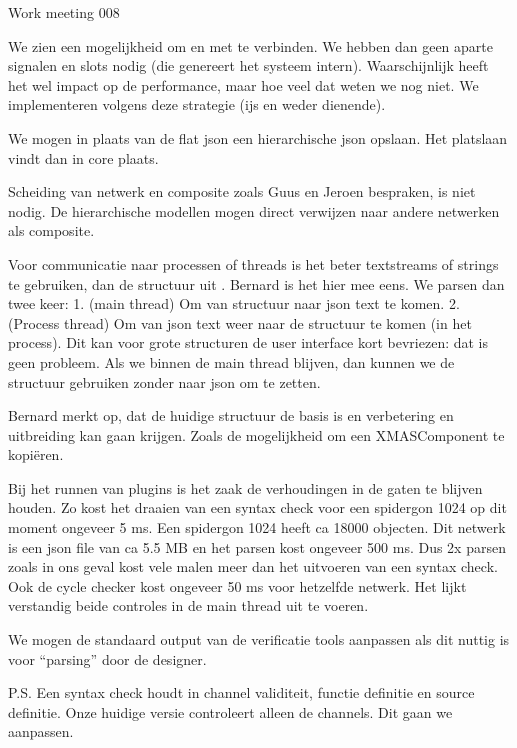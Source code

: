 \documentclass[a4paper,final]{article}
\begin{document}
\begin{Minutes}{Work meeting 008}

We zien een mogelijkheid om \qml en \cpp met \qml {} te verbinden. 
We hebben dan geen aparte signalen en slots nodig (die genereert het systeem intern).
Waarschijnlijk heeft het wel impact op de performance, maar hoe veel dat weten we nog niet.  
We implementeren volgens deze strategie (ijs en weder dienende).


We mogen in plaats van de flat json een hierarchische json opslaan. Het platslaan vindt
dan in core plaats.

Scheiding van netwerk en composite zoals Guus en Jeroen bespraken, is niet nodig. 
De hierarchische modellen mogen direct verwijzen naar andere netwerken als composite.


Voor communicatie naar processen of threads is het beter textstreams of strings te gebruiken, 
dan de \cpp structuur uit . Bernard is het hier mee eens.
We parsen dan twee keer: 1. (main thread) Om van \cpp structuur naar json text te komen. 2. (Process thread) 
Om van json text weer naar de \cpp structuur te komen (in het \vt process). Dit kan voor grote structuren de 
user interface kort bevriezen: dat is geen probleem. Als we binnen de main thread blijven, 
dan kunnen we de structuur gebruiken zonder naar json om te zetten.

Bernard merkt op, dat de huidige structuur de basis is en verbetering en uitbreiding kan gaan 
krijgen. Zoals de mogelijkheid om een XMASComponent te kopi\"{e}ren.



Bij het runnen van plugins is het zaak de verhoudingen in de gaten te blijven houden. Zo kost
het draaien van een syntax check voor een spidergon 1024 op dit moment ongeveer 5 ms. Een 
spidergon 1024 heeft ca 18000 objecten. Dit netwerk is een json file van ca 5.5 MB en het parsen kost
ongeveer 500 ms. Dus 2x parsen zoals in ons geval kost vele malen meer dan het uitvoeren 
van een syntax check. Ook de cycle checker kost ongeveer 50 ms voor hetzelfde netwerk. 
Het lijkt verstandig beide controles in de main thread uit te voeren.

We mogen de standaard output van de verificatie tools aanpassen als dit nuttig is voor 
``parsing'' door de designer.

P.S. Een syntax check houdt in channel validiteit, functie definitie en source definitie. Onze huidige
versie controleert alleen de channels. Dit gaan we aanpassen.


\end{Minutes}
\end{document}
